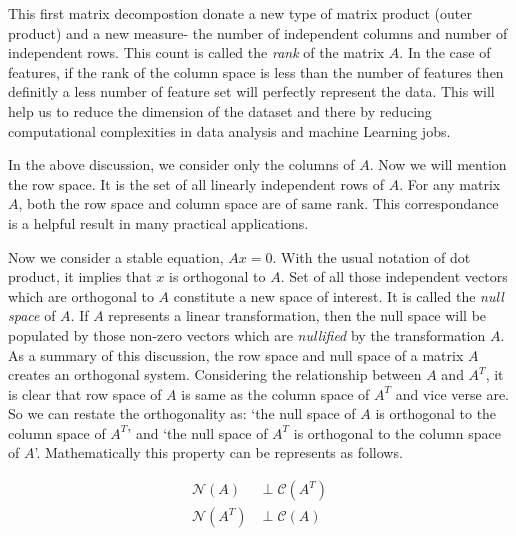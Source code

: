\documentclass[
  letterpaper,
  DIV=11,
  numbers=noendperiod]{scrreprt}
\theoremstyle{plain}
\theoremstyle{definition}
\theoremstyle{remark}
\begin{document}
This first matrix decompostion donate a new type of matrix product
(outer product) and a new measure- the number of independent columns and
number of independent rows. This count is called the \emph{rank} of the
matrix \(A\). In the case of features, if the rank of the column space
is less than the number of features then definitly a less number of
feature set will perfectly represent the data. This will help us to
reduce the dimension of the dataset and there by reducing computational
complexities in data analysis and machine Learning jobs.

In the above discussion, we consider only the columns of \(A\). Now we
will mention the row space. It is the set of all linearly independent
rows of \(A\). For any matrix \(A\), both the row space and column space
are of same rank. This correspondance is a helpful result in many
practical applications.

Now we consider a stable equation, \(Ax=0\). With the usual notation of
dot product, it implies that \(x\) is orthogonal to \(A\). Set of all
those independent vectors which are orthogonal to \(A\) constitute a new
space of interest. It is called the \emph{null space} of \(A\). If \(A\)
represents a linear transformation, then the null space will be
populated by those non-zero vectors which are \emph{nullified} by the
transformation \(A\). As a summary of this discussion, the row space and
null space of a matrix \(A\) creates an orthogonal system. Considering
the relationship between \(A\) and \(A^T\), it is clear that row space
of \(A\) is same as the column space of \(A^T\) and vice verse are. So
we can restate the orthogonality as: `the null space of \(A\) is
orthogonal to the column space of \(A^T\)' and `the null space of
\(A^T\) is orthogonal to the column space of \(A\)'. Mathematically this
property can be represents as follows.

\begin{tcolorbox}[enhanced jigsaw, opacityback=0, leftrule=.75mm, bottomrule=.15mm, titlerule=0mm, colback=white, rightrule=.15mm, coltitle=black, left=2mm, breakable, bottomtitle=1mm, toptitle=1mm, colbacktitle=quarto-callout-note-color!10!white, title=\textcolor{quarto-callout-note-color}{\faInfo}\hspace{0.5em}{Note}, arc=.35mm, toprule=.15mm, opacitybacktitle=0.6, colframe=quarto-callout-note-color-frame]

\begin{align*}
\mathcal{N}(A)&\perp \mathcal{C}(A^T)\\
\mathcal{N}(A^T)&\perp \mathcal{C}(A)
\end{align*}

\end{tcolorbox}
\end{document}
